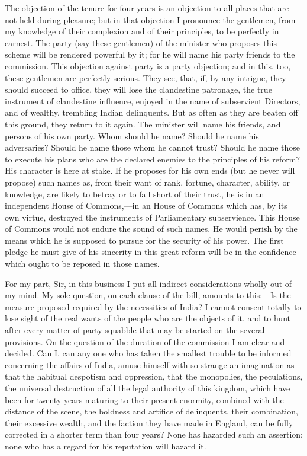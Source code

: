 The objection of the tenure for four years is an objection to all places that are not held during pleasure; but in that objection I pronounce the gentlemen, from my knowledge of their complexion and of their principles, to be perfectly in earnest. The party (say these gentlemen) of the minister who proposes this scheme will be rendered powerful by it; for he will name his party friends to the commission. This objection against party is a party objection; and in this, too, these gentlemen are perfectly serious. They see, that, if, by any intrigue, they should succeed to office, they will lose the clandestine patronage, the true instrument of clandestine influence, enjoyed in the name of subservient Directors, and of wealthy, trembling Indian delinquents. But as often as they are beaten off this ground, they return to it again. The minister will name his friends, and persons of his own party. Whom should he name? Should he name his adversaries? Should he name those whom he cannot trust? Should he name those to execute his plans who are the declared enemies to the principles of his reform? His character is here at stake. If he proposes for his own ends (but he never will propose) such names as, from their want of rank, fortune, character, ability, or knowledge, are likely to betray or to fall short of their trust, he is in an independent House of Commons,—in an House of Commons which has, by its own virtue, destroyed the instruments of Parliamentary subservience. This House of Commons would not endure the sound of such names. He would perish by the means which he is supposed to pursue for the security of his power. The first pledge he must give of his sincerity in this great reform will be in the confidence which ought to be reposed in those names.

For my part, Sir, in this business I put all indirect considerations wholly out of my mind. My sole question, on each clause of the bill, amounts to this:—Is the measure proposed required by the necessities of India? I cannot consent totally to lose sight of the real wants of the people who are the objects of it, and to hunt after every matter of party squabble that may be started on the several provisions. On the question of the duration of the commission I am clear and decided. Can I, can any one who has taken the smallest trouble to be informed concerning the affairs of India, amuse himself with so strange an imagination as that the habitual despotism and oppression, that the monopolies, the peculations, the universal destruction of all the legal authority of this kingdom, which have been for twenty years maturing to their present enormity, combined with the distance of the scene, the boldness and artifice of delinquents, their combination, their excessive wealth, and the faction they have made in England, can be fully corrected in a shorter term than four years? None has hazarded such an assertion; none who has a regard for his reputation will hazard it.

